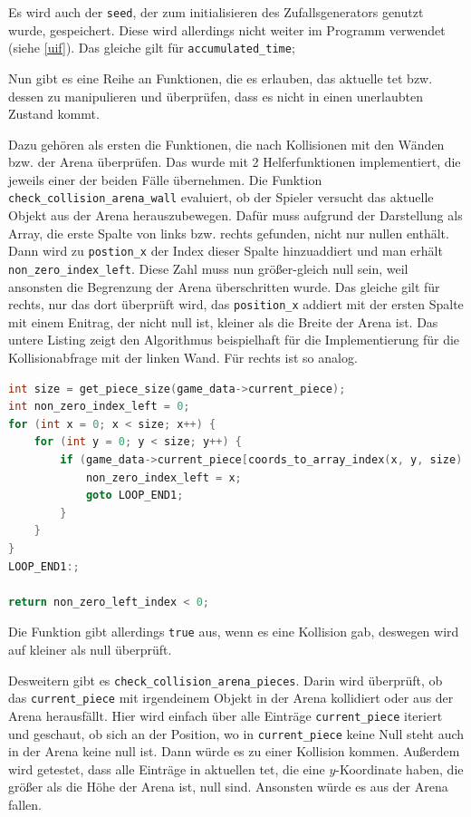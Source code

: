 \documentclass[11pt]{article}
\newcommand{\lstin}[1]{\lstinline[language=C]{#1}}
\begin{document}
Es wird auch der \lstin{seed}, der zum initialisieren des Zufallsgenerators genutzt wurde, gespeichert. Diese wird allerdings nicht weiter im Programm verwendet (siehe \ref{uif}).
Das gleiche gilt für \lstin{accumulated_time};

Nun gibt es eine Reihe an Funktionen, die es erlauben, das aktuelle \gls{tet} bzw. dessen zu manipulieren und überprüfen, dass es nicht in einen unerlaubten Zustand kommt.

Dazu gehören als ersten die Funktionen, die nach Kollisionen mit den Wänden bzw. der Arena überprüfen. 
Das wurde mit 2 Helferfunktionen implementiert, die jeweils einer der beiden Fälle übernehmen.
Die Funktion \lstin{check_collision_arena_wall} evaluiert, ob der Spieler versucht das aktuelle Objekt aus der Arena herauszubewegen. 
Dafür muss aufgrund der Darstellung als Array, die erste Spalte von links bzw. rechts gefunden, nicht nur nullen enthält.
Dann wird zu \lstin{postion_x} der Index dieser Spalte hinzuaddiert und man erhält \lstin{non_zero_index_left}. Diese Zahl muss nun größer-gleich null sein, weil ansonsten die Begrenzung der Arena überschritten wurde.
Das gleiche gilt für rechts, nur das dort überprüft wird, das \lstin{position_x} addiert mit der ersten Spalte mit einem Enitrag, der nicht null ist, kleiner als die Breite der Arena ist.
Das untere Listing zeigt den Algorithmus beispielhaft für die Implementierung für die Kollisionabfrage mit der linken Wand. Für rechts ist so analog.
\begin{lstlisting}[language=C]
int size = get_piece_size(game_data->current_piece);
int non_zero_index_left = 0;
for (int x = 0; x < size; x++) {
    for (int y = 0; y < size; y++) {
        if (game_data->current_piece[coords_to_array_index(x, y, size) + 1] != 0) {
            non_zero_index_left = x;
            goto LOOP_END1;
        }
    }
}
LOOP_END1:;

return non_zero_left_index < 0; 
\end{lstlisting}

Die Funktion gibt allerdings \lstin{true} aus, wenn es eine Kollision gab, deswegen wird auf kleiner als null überprüft.

Desweitern gibt es \lstin{check_collision_arena_pieces}. Darin wird überprüft, ob das \lstin{current_piece} mit irgendeinem Objekt in der Arena kollidiert oder aus der Arena herausfällt.
Hier wird einfach über alle Einträge \lstin{current_piece} iteriert und geschaut, ob sich an der Position, wo in \lstin{current_piece} keine Null steht auch in der Arena keine null ist. 
Dann würde es zu einer Kollision kommen. Außerdem wird getestet, dass alle Einträge in aktuellen \gls{tet}, die eine $y$-Koordinate haben, die größer als die Höhe der Arena ist, null sind.
Ansonsten würde es aus der Arena fallen.
\end{document}
